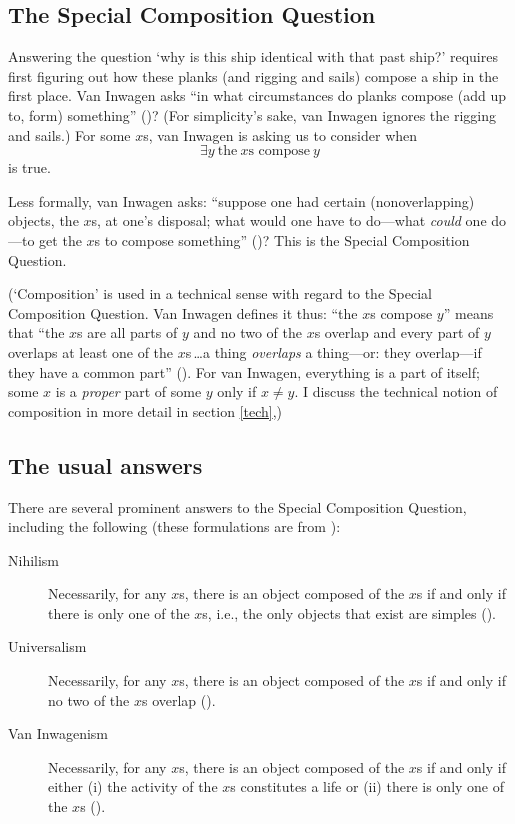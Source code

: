 \documentclass[11pt]{article}
\begin{document}
\begin{spacing}{1.5}
\subsection{The Special Composition Question}
\label{scq}
Answering the question `why is this ship identical with that past
ship?' requires first figuring out how these planks (and rigging and
sails) compose a ship in the first place.  Van Inwagen asks ``in what
circumstances do planks compose (add up to, form) something''
(\citeyear[21]{inwagen1995})?  (For simplicity's sake, van Inwagen
ignores the rigging and sails.)  For some $x$s, van Inwagen is asking
us to consider when
\begin{displaymath}
\exists y\ \text{the}\ x\text{s compose}\ y
\end{displaymath}
is true.

Less formally, van Inwagen asks: ``suppose one had certain
(nonoverlapping) objects, the $x$s, at one's disposal; what would one
have to do---what {\em could} one do---to get the $x$s to compose
something'' (\citeyear[31]{inwagen1995})?  This is the Special
Composition Question.

(`Composition' is used in a technical sense with regard to the Special
Composition Question.  Van Inwagen defines it thus: ``the $x$s compose
$y$'' means that ``the $x$s are all parts of $y$ and no two of the
$x$s overlap and every part of $y$ overlaps at least one of the
$x$s\,\ldots a thing {\em overlaps} a thing---or: they overlap---if
they have a common part'' (\citeyear[29]{inwagen1995}).  For van
Inwagen, everything is a part of itself; some $x$ is a {\em proper}
part of some $y$ only if $x \neq y$.  I discuss the technical notion
of composition in more detail in section \ref{tech},)

\subsection{The usual answers}
\label{scq-ans}
There are several prominent answers to the Special Composition
Question, including the following (these formulations are from
\citet{markosian1998a}):
\begin{description}
	\item[Nihilism] Necessarily, for any $x$s, there is an object
          composed of the $x$s if and only if there is only one of the
          $x$s, i.e., the only objects that exist are simples
          (\citeyear[219]{markosian1998a}).
	\item[Universalism] Necessarily, for any $x$s, there is an
          object composed of the $x$s if and only if no two of the
          $x$s overlap (\citeyear[227]{markosian1998a}).
	\item[Van Inwagenism] Necessarily, for any $x$s, there is an
          object composed of the $x$s if and only if either (i) the
          activity of the $x$s constitutes a life or (ii) there is
          only one of the $x$s (\citeyear[221]{markosian1998a}).
\end{description}


\end{spacing}
\end{document}
